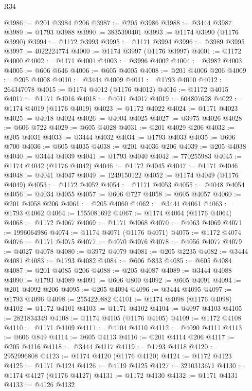 \begin{lexlean}{R34}
\begin{coremodule}
@3986 := @201 @3984 @206
@3987 := @205 @3986
@3988 := @3444 @3987
@3989 := @1793 @3988
@3990 := 3835390401
@3993 := @1174 @3990 (@1176 @3990)
@3994 := @1172 @3993
@3995 := @1171 @3994
@3996 := @3989 @3995
@3997 := 4022224774
@4000 := @1174 @3997 (@1176 @3997)
@4001 := @1172 @4000
@4002 := @1171 @4001
@4003 := @3996 @4002
@4004 := @3982 @4003
@4005 := @606 @646
@4006 := @605 @4005
@4008 := @201 @4006 @206
@4009 := @205 @4008
@4010 := @3444 @4009
@4011 := @1793 @4010
@4012 := 264347078
@4015 := @1174 @4012 (@1176 @4012)
@4016 := @1172 @4015
@4017 := @1171 @4016
@4018 := @4011 @4017
@4019 := 604807628
@4022 := @1174 @4019 (@1176 @4019)
@4023 := @1172 @4022
@4024 := @1171 @4023
@4025 := @4018 @4024
@4026 := @4004 @4025
@4027 := @3975 @4026
@4028 := @606 @722
@4029 := @605 @4028
@4031 := @201 @4029 @206
@4032 := @205 @4031
@4033 := @3444 @4032
@4034 := @1793 @4033
@4035 := @606 @700
@4036 := @605 @4035
@4038 := @201 @4036 @206
@4039 := @205 @4038
@4040 := @3444 @4039
@4041 := @1793 @4040
@4042 := 770255983
@4045 := @1174 @4042 (@1176 @4042)
@4046 := @1172 @4045
@4047 := @1171 @4046
@4048 := @4041 @4047
@4049 := 1249150122
@4052 := @1174 @4049 (@1176 @4049)
@4053 := @1172 @4052
@4054 := @1171 @4053
@4055 := @4048 @4054
@4056 := @4034 @4055
@4057 := @606 @727
@4058 := @605 @4057
@4060 := @201 @4058 @206
@4061 := @205 @4060
@4062 := @3444 @4061
@4063 := @1793 @4062
@4064 := 1555081692
@4067 := @1174 @4064 (@1176 @4064)
@4068 := @1172 @4067
@4069 := @1171 @4068
@4070 := @4063 @4069
@4071 := 1996064986
@4074 := @1174 @4071 (@1176 @4071)
@4075 := @1172 @4074
@4076 := @1171 @4075
@4077 := @4070 @4076
@4078 := @4056 @4077
@4079 := @4027 @4078
@4080 := @3972 @4079
@4081 := @205 @2235
@4082 := @3444 @4081
@4083 := @1793 @4082
@4084 := @606 @833
@4085 := @605 @4084
@4087 := @201 @4085 @206
@4088 := @205 @4087
@4089 := @3444 @4088
@4090 := @1793 @4089
@4091 := @606 @800
@4092 := @605 @4091
@4094 := @201 @4092 @206
@4095 := @205 @4094
@4096 := @3444 @4095
@4097 := @1793 @4096
@4098 := 2554220882
@4101 := @1174 @4098 (@1176 @4098)
@4102 := @1172 @4101
@4103 := @1171 @4102
@4104 := @4097 @4103
@4105 := 2821834349
@4108 := @1174 @4105 (@1176 @4105)
@4109 := @1172 @4108
@4110 := @1171 @4109
@4111 := @4104 @4110
@4112 := @4090 @4111
@4113 := @606 @849
@4114 := @605 @4113
@4116 := @201 @4114 @206
@4117 := @205 @4116
@4118 := @3444 @4117
@4119 := @1793 @4118
@4120 := 2952996808
@4123 := @1174 @4120 (@1176 @4120)
@4124 := @1172 @4123
@4125 := @1171 @4124
@4126 := @4119 @4125
@4127 := 3210313671
@4130 := @1174 @4127 (@1176 @4127)
@4131 := @1172 @4130
@4132 := @1171 @4131
@4133 := @4126 @4132

\end{coremodule}
\end{lexlean}

